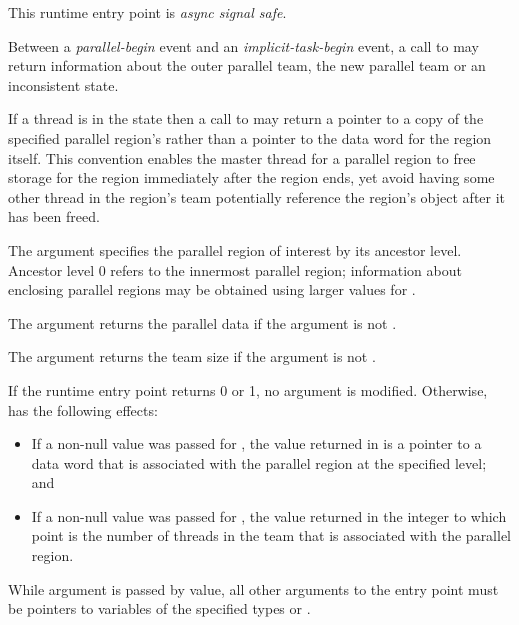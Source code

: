 This runtime entry point is \emph{async signal safe}.

Between a \emph{parallel-begin} event and an \emph{implicit-task-begin} event, 
a call to  may return information about 
the outer parallel team, the new parallel team or an inconsistent state.

If a thread is in the state 
then a call to  may return a pointer to a copy 
of the specified parallel region's  rather than a pointer 
to the data word for the region itself. This convention enables the master 
thread for a parallel region to free storage for the region immediately after 
the region ends, yet avoid having some other thread in the region's team potentially 
reference the region's  object after it has been freed.

\argdesc
The  argument specifies the parallel region of 
interest by its ancestor level. Ancestor level 0 refers to the innermost 
parallel region; information about enclosing parallel regions may be 
obtained using larger values for .

The  argument returns the parallel data if the 
argument is not .

The  argument returns the team size if the argument 
is not .

\effect
If the runtime entry point returns 0 or 1, no argument is modified. 
Otherwise,  has the following effects:

\begin{itemize}
\item If a non-null value was passed for , the value 
      returned in  is a pointer to a data word that is
      associated with the parallel region at the specified level; and
\item If a non-null value was passed for , the value
      returned in the integer to which  point is the 
      number of threads in the team that is associated with the parallel region.
\end{itemize}

\constraints
While argument  is passed by value, all other arguments 
to the entry point must be pointers to variables of the specified types or .

